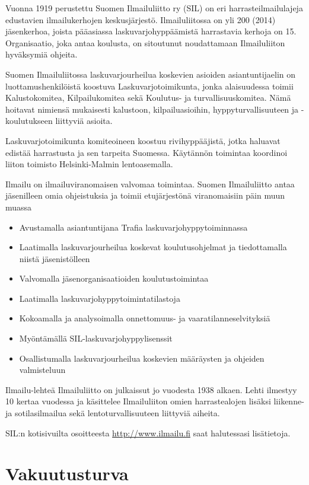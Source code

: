 Vuonna 1919 perustettu Suomen Ilmailuliitto ry (SIL) on eri harrasteilmailulajeja edustavien ilmailukerhojen keskusjärjestö. Ilmailuliitossa on yli 200 (2014) jäsenkerhoa, joista pääasiassa laskuvarjohyppäämistä harrastavia kerhoja on 15. Organisaatio, joka antaa koulusta, on sitoutunut noudattamaan Ilmailuliiton hyväksymiä ohjeita.  


Suomen Ilmailuliitossa laskuvarjourheilua koskevien asioiden asiantuntijaelin on luottamushenkilöistä koostuva Laskuvarjotoimikunta, jonka alaisuudessa toimii Kalustokomitea,  Kilpailukomitea sekä Koulutus- ja turvallisuuskomitea. Nämä hoitavat nimiensä mukaisesti kalustoon, kilpailuasioihin, hyppyturvallisuuteen ja -koulutukseen liittyviä asioita.  


Laskuvarjotoimikunta komiteoineen koostuu rivihyppääjistä, jotka haluavat edistää harrastusta ja sen tarpeita Suomessa. Käytännön toimintaa koordinoi liiton toimisto Helsinki-Malmin lentoasemalla.  


Ilmailu on ilmailuviranomaisen valvomaa toimintaa. Suomen Ilmailuliitto antaa jäsenilleen omia ohjeistuksia ja toimii etujärjestönä viranomaisiin päin muun muassa 

\begin{itemize}
\item  Avustamalla asiantuntijana Trafia laskuvarjohyppytoiminnassa 
\item  Laatimalla laskuvarjourheilua koskevat koulutusohjelmat ja tiedottamalla niistä jäsenistölleen 
\item  Valvomalla jäsenorganisaatioiden koulutustoimintaa 
\item  Laatimalla laskuvarjohyppytoimintatilastoja  
\item  Kokoamalla ja analysoimalla onnettomuus- ja vaaratilanneselvityksiä 
\item  Myöntämällä SIL-laskuvarjohyppylisenssit 
\item  Osallistumalla laskuvarjourheilua koskevien määräysten ja ohjeiden valmisteluun 
\end{itemize}

Ilmailu-lehteä Ilmailuliitto on julkaissut jo vuodesta 1938 alkaen. Lehti ilmestyy 10 kertaa vuodessa ja käsittelee Ilmailuliiton omien harrastealojen lisäksi liikenne- ja sotilasilmailua sekä lentoturvallisuuteen liittyviä aiheita. 


SIL:n kotisivuilta osoitteesta \url{http://www.ilmailu.fi} saat halutessasi lisätietoja. 

\section{ Vakuutusturva }
\label{tervetuloa-taivaalle-vakuutusturva}


